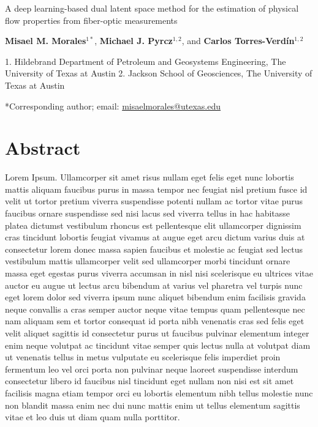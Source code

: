 \documentclass[10pt, twoside]{article}
\begin{document}
\doublespacing

\begin{center}
    {\huge A deep learning-based dual latent space method for the estimation of physical flow properties from fiber-optic measurements}
    \vspace{5mm}
    
    \textbf{Misael M. Morales$^{1*}$}, 
    \textbf{Michael J. Pyrcz$^{1,2}$}, and 
    \textbf{Carlos Torres-Verd\'in$^{1,2}$}
\end{center}

\begin{flushleft}
    1. Hildebrand Department of Petroleum and Geosystems Engineering, The University of Texas at Austin
    2. Jackson School of Geosciences, The University of Texas at Austin
    
    *Corresponding author; email: \url{misaelmorales@utexas.edu}
\end{flushleft}

\section*{\textbf{Abstract}}
Lorem Ipsum. Ullamcorper sit amet risus nullam eget felis eget nunc lobortis mattis aliquam faucibus purus in massa tempor nec feugiat nisl pretium fusce id velit ut tortor pretium viverra suspendisse potenti nullam ac tortor vitae purus faucibus ornare suspendisse sed nisi lacus sed viverra tellus in hac habitasse platea dictumst vestibulum rhoncus est pellentesque elit ullamcorper dignissim cras tincidunt lobortis feugiat vivamus at augue eget arcu dictum varius duis at consectetur lorem donec massa sapien faucibus et molestie ac feugiat sed lectus vestibulum mattis ullamcorper velit sed ullamcorper morbi tincidunt ornare massa eget egestas purus viverra accumsan in nisl nisi scelerisque eu ultrices vitae auctor eu augue ut lectus arcu bibendum at varius vel pharetra vel turpis nunc eget lorem dolor sed viverra ipsum nunc aliquet bibendum enim facilisis gravida neque convallis a cras semper auctor neque vitae tempus quam pellentesque nec nam aliquam sem et tortor consequat id porta nibh venenatis cras sed felis eget velit aliquet sagittis id consectetur purus ut faucibus pulvinar elementum integer enim neque volutpat ac tincidunt vitae semper quis lectus nulla at volutpat diam ut venenatis tellus in metus vulputate eu scelerisque felis imperdiet proin fermentum leo vel orci porta non pulvinar neque laoreet suspendisse interdum consectetur libero id faucibus nisl tincidunt eget nullam non nisi est sit amet facilisis magna etiam tempor orci eu lobortis elementum nibh tellus molestie nunc non blandit massa enim nec dui nunc mattis enim ut tellus elementum sagittis vitae et leo duis ut diam quam nulla porttitor.
\end{document}
